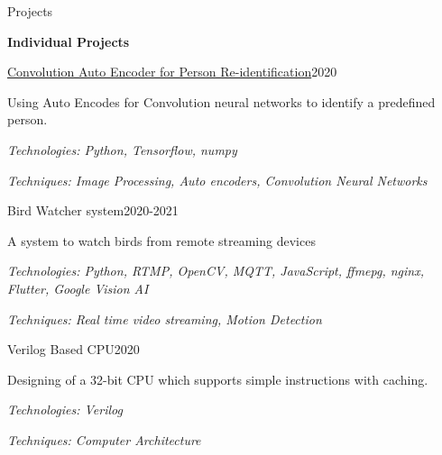 \documentclass{resume} %
\begin{document}
\begin{rSection}{Projects}




\textbf{Individual Projects}\\

\begin{rSubsection}{\href{https://github.com/HeshanDissanayake/Convolutional_Auto_encoder}{Convolution Auto Encoder for Person Re-identification}}{2020}{}{}
\item Using Auto Encodes for Convolution neural networks to identify a predefined person. \item 
\textit{Technologies: Python, Tensorflow, numpy}
\item \textit{Techniques: Image Processing, Auto encoders, Convolution Neural Networks}
\end{rSubsection}

\begin{rSubsection}{Bird Watcher system}{2020-2021}{}{}
\item A system to watch birds from remote streaming devices \item 
\textit{Technologies: Python, RTMP, OpenCV, MQTT, JavaScript, ffmepg, nginx, Flutter, Google Vision AI}
\item \textit{Techniques: Real time video streaming, Motion Detection}
\end{rSubsection}


\begin{rSubsection}{Verilog Based CPU}{2020}{}{}
\item Designing of a 32-bit CPU which supports simple instructions with caching. \item 
\textit{Technologies: Verilog}
\item \textit{Techniques: Computer Architecture }
\end{rSubsection}


\end{rSection}


\end{document}
